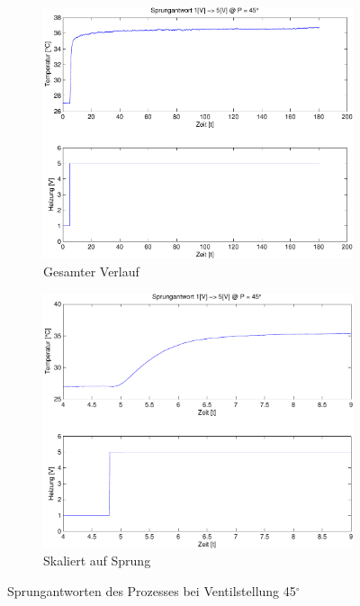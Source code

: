 \begin{figure}[h!]
	\begin{subfigure}{0.475\textwidth}
		\includegraphics[width=1\textwidth]{03/step_half.pdf}
		\caption{Gesamter Verlauf}
	\end{subfigure}
	\hfill{}
	\begin{subfigure}{0.475\textwidth}
		\includegraphics[width=1\textwidth]{03/step_half_scale.pdf}
		\caption{Skaliert auf Sprung}
	\end{subfigure}
	\caption{Sprungantworten des Prozesses bei Ventilstellung 45$^\circ$}
	\label{fig:03b}
\end{figure}
